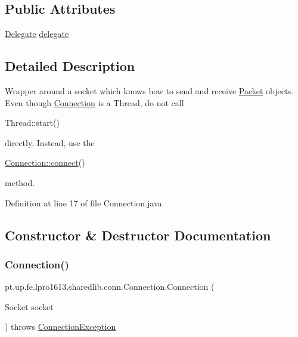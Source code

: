 \subsection*{Public Attributes}
\begin{DoxyCompactItemize}
\item 
\hyperlink{interfacept_1_1up_1_1fe_1_1lpro1613_1_1sharedlib_1_1conn_1_1_connection_1_1_delegate}{Delegate} \hyperlink{classpt_1_1up_1_1fe_1_1lpro1613_1_1sharedlib_1_1conn_1_1_connection_ad0181759fff34ee0320a29111462ef94}{delegate}
\end{DoxyCompactItemize}


\subsection{Detailed Description}
Wrapper around a socket which knows how to send and receive \hyperlink{classpt_1_1up_1_1fe_1_1lpro1613_1_1sharedlib_1_1conn_1_1_packet}{Packet} objects. Even though \hyperlink{classpt_1_1up_1_1fe_1_1lpro1613_1_1sharedlib_1_1conn_1_1_connection}{Connection} is a Thread, do not call
\begin{DoxyCode}
Thread::start() 
\end{DoxyCode}
 directly. Instead, use the
\begin{DoxyCode}
\hyperlink{classpt_1_1up_1_1fe_1_1lpro1613_1_1sharedlib_1_1conn_1_1_connection_a8ccfed3defecf3a4070c32a0f3d6acb7}{Connection::connect}() 
\end{DoxyCode}
 method. 

Definition at line 17 of file Connection.\+java.



\subsection{Constructor \& Destructor Documentation}
\hypertarget{classpt_1_1up_1_1fe_1_1lpro1613_1_1sharedlib_1_1conn_1_1_connection_ad3c3b594a0c16b3b95f504039700a876}{}\label{classpt_1_1up_1_1fe_1_1lpro1613_1_1sharedlib_1_1conn_1_1_connection_ad3c3b594a0c16b3b95f504039700a876} 
\subsubsection{\texorpdfstring{Connection()}{Connection()}}
{\footnotesize\ttfamily pt.\+up.\+fe.\+lpro1613.\+sharedlib.\+conn.\+Connection.\+Connection (\begin{DoxyParamCaption}\item[{Socket}]{socket }\end{DoxyParamCaption}) throws \hyperlink{classpt_1_1up_1_1fe_1_1lpro1613_1_1sharedlib_1_1exceptions_1_1_connection_exception}{Connection\+Exception}}

